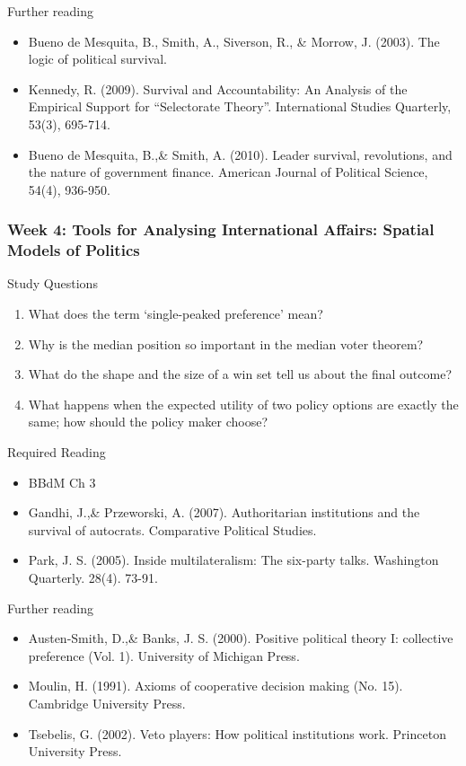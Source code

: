 \documentclass[12pt,a4paper]{article}
\begin{document}
\noindent Further reading

\begin{itemize}
	\item Bueno de Mesquita, B., Smith, A., Siverson, R., \& Morrow, J. (2003). The logic of political survival.
	\item Kennedy, R. (2009). Survival and Accountability: An Analysis of the Empirical Support for “Selectorate Theory”. International Studies Quarterly, 53(3), 695-714.
	\item Bueno de Mesquita, B.,\& Smith, A. (2010). Leader survival, revolutions, and the nature of government finance. American Journal of Political Science, 54(4), 936-950.
\end{itemize}

\subsubsection*{Week 4: Tools for Analysing International Affairs: Spatial Models of Politics}

Study Questions

\begin{enumerate}
	\item What does the term `single-peaked preference' mean? 
	\item Why is the median position so important in the median voter theorem? 
	\item What do the shape and the size of a win set tell us about the final outcome? 
	\item What happens when the expected utility of two policy options are exactly the same; how should the policy maker choose?
\end{enumerate}

\noindent Required Reading

\begin{itemize}
	\item BBdM Ch 3
	\item Gandhi, J.,\& Przeworski, A. (2007). Authoritarian institutions and the survival of autocrats. Comparative Political Studies.
	\item Park, J. S. (2005). Inside multilateralism: The six-party talks. Washington Quarterly. 28(4). 73-91.
\end{itemize}

\noindent Further reading

\begin{itemize}
	\item Austen-Smith, D.,\& Banks, J. S. (2000). Positive political theory I: collective preference (Vol. 1). University of Michigan Press.
	\item Moulin, H. (1991). Axioms of cooperative decision making (No. 15). Cambridge University Press.
	\item Tsebelis, G. (2002). Veto players: How political institutions work. Princeton University Press.
\end{itemize}
\end{document}

